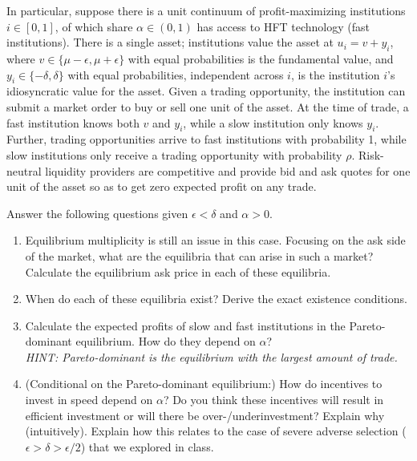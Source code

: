 	In particular, suppose there is a unit continuum of profit-maximizing institutions $i \in [0,1]$, of which share $\alpha \in (0,1)$ has access to HFT technology (fast institutions). There is a single asset; institutions value the asset at $u_i = v+y_i$, where $v \in \{\mu-\epsilon, \mu+\epsilon\}$ with equal probabilities is the fundamental value, and $y_i \in \{-\delta, \delta\}$ with equal probabilities, independent across $i$, is the institution $i$'s idiosyncratic value for the asset. Given a trading opportunity, the institution can submit a market order to buy or sell one unit of the asset. At the time of trade, a fast institution knows both $v$ and $y_i$, while a slow institution only knows $y_i$. Further, trading opportunities arrive to fast institutions with probability 1, while slow institutions only receive a trading opportunity with probability $\rho$. Risk-neutral liquidity providers are competitive and provide bid and ask quotes for one unit of the asset so as to get zero expected profit on any trade.
	
	Answer the following questions given $\epsilon < \delta$ and $\alpha > 0$.
	\begin{enumerate}
		\item Equilibrium multiplicity is still an issue in this case. Focusing on the ask side of the market, what are the equilibria that can arise in such a market? Calculate the equilibrium ask price in each of these equilibria.
		
		\item When do each of these equilibria exist? Derive the exact existence conditions.
		
		\item Calculate the expected profits of slow and fast institutions in the Pareto-dominant equilibrium. How do they depend on $\alpha$? 
		\\
		\emph{HINT: Pareto-dominant is the equilibrium with the largest amount of trade.}
		
		\item (Conditional on the Pareto-dominant equilibrium:) How do incentives to invest in speed depend on $\alpha$? Do you think these incentives will result in efficient investment or will there be over-/underinvestment? Explain why (intuitively). Explain how this relates to the case of severe adverse selection ($\epsilon > \delta > \epsilon/2$) that we explored in class.
	\end{enumerate}



